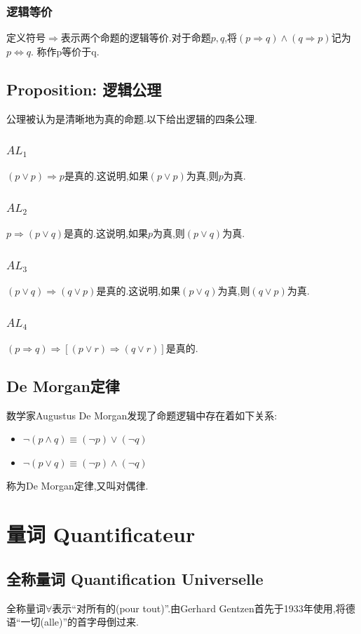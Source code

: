 \documentclass[12pt, a4paper, oneside]{ctexbook}
\begin{document}
  \subsubsection{逻辑等价}
  定义符号$\Rightarrow$表示两个命题的逻辑等价.对于命题$p,q$,将$(p\Rightarrow q)\land (q\Rightarrow p)$记为$p\Leftrightarrow q$.
  称作p等价于q.
  \subsection{Proposition: 逻辑公理}
  公理被认为是清晰地为真的命题.以下给出逻辑的四条公理.
  \subsubsection{$AL_1$}
  $(p\lor p)\Rightarrow p$是真的.这说明,如果$(p\lor p)$为真,则$p$为真.
  \subsubsection{$AL_2$}
  $p\Rightarrow (p\lor q)$是真的.这说明,如果$p$为真,则$(p\lor q)$为真.
  \subsubsection{$AL_3$}
  $(p\lor q)\Rightarrow (q\lor p)$是真的.这说明,如果$(p\lor q)$为真,则$(q\lor p)$为真.
  \subsubsection{$AL_4$}
  $(p\Rightarrow q)\Rightarrow [(p\lor r)\Rightarrow(q\lor r)]$是真的.
  \subsection{De Morgan定律}
  数学家Augustus De Morgan发现了命题逻辑中存在着如下关系:
  \begin{itemize}
    \item $\lnot (p\wedge q)\equiv (\lnot p)\vee (\lnot q) $
    \item $\lnot (p\vee q)\equiv (\lnot p)\wedge (\lnot q) $
  \end{itemize}称为De Morgan定律,又叫对偶律.

  \section{量词 Quantificateur}
  \subsection{全称量词 Quantification Universelle}
  全称量词$\forall$表示“对所有的(pour tout)”.由Gerhard Gentzen首先于1933年使用,将德语“一切(alle)”的首字母倒过来.
\end{document}
